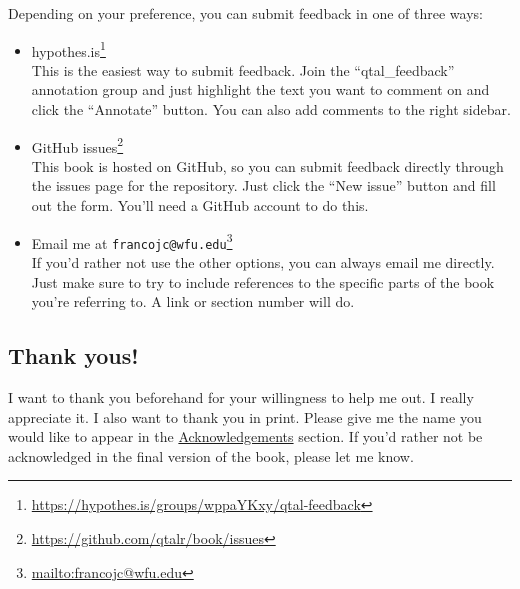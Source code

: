 \documentclass[
  letterpaper,
  DIV=11,
  numbers=noendperiod]{scrreport}
\theoremstyle{definition}
\theoremstyle{remark}
\DeclareRobustCommand{\href}[2]{#2\footnote{\url{#1}}}
\begin{document}
Depending on your preference, you can submit feedback in one of three
ways:

\begin{itemize}
\item
  \href{https://hypothes.is/groups/wppaYKxy/qtal-feedback}{hypothes.is}\\
  This is the easiest way to submit feedback. Join the
  ``qtal\_feedback'' annotation group and just highlight the text you
  want to comment on and click the ``Annotate'' button. You can also add
  comments to the right sidebar.
\item
  \href{https://github.com/qtalr/book/issues}{GitHub issues}\\
  This book is hosted on GitHub, so you can submit feedback directly
  through the issues page for the repository. Just click the ``New
  issue'' button and fill out the form. You'll need a GitHub account to
  do this.
\item
  Email me at
  \href{mailto:francojc@wfu.edu}{\nolinkurl{francojc@wfu.edu}}\\
  If you'd rather not use the other options, you can always email me
  directly. Just make sure to try to include references to the specific
  parts of the book you're referring to. A link or section number will
  do.
\end{itemize}

\hypertarget{thank-yous}{%
\subsection*{Thank yous!}\label{thank-yous}}

I want to thank you beforehand for your willingness to help me out. I
really appreciate it. I also want to thank you in print. Please give me
the name you would like to appear in the
\protect\hyperlink{acknowledgements}{Acknowledgements} section. If you'd
rather not be acknowledged in the final version of the book, please let
me know.



\printindex
\end{document}
